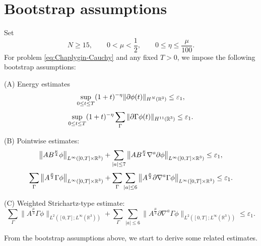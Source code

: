 \documentclass[11pt,twoside]{article}
\def\R{\mathop{\mathbb R\kern 0pt}\nolimits}
\def\f{\frac}
\def\p{\partial}
\def\ve{\varepsilon}
\theoremstyle{plain}
\theoremstyle{definition}
\theoremstyle{assumption}
\numberwithin{equation}{section}
\begin{document}
	\section{Bootstrap assumptions}
	\label{sec:CVP-bootstrap-assumptions}

	
	Set
		\begin{equation}
		\label{eq:CVP-bootstrap-parameter-range}
		N \ge 15,
		\qquad
		0<\mu<\frac12,
		\qquad
		0\le\eta\le\frac{\mu}{100}.
	\end{equation}
	For problem \eqref{eq:Chaplygin-Cauchy} and any fixed $T>0$, we impose the following bootstrap assumptions:

(A)  Energy estimates
	\begin{equation}
		\label{eq:CVP-bootstrap-energy-ordinary}
		\sup_{0\le t\le T}
		(1+t)^{-\eta}
		\|\p\phi(t)\|_{H^N(\R^3)}
		\le
		\ve_1,
	\end{equation}
	\begin{equation}
		\label{eq:CVP-bootstrap-energy-Gamma}
		\sup_{0\le t\le T}
		(1+t)^{-\eta}
		\sum_{\Gamma}
		\|\p\Gamma\phi(t)\|_{H^{11}(\R^3)}
		\le
		\ve_1.
	\end{equation}

(B) Pointwise estimates:
	\begin{equation}\label{eq:CVP-bootstrap-pointwise-phi}
		\big\|
		AB^{\f\mu4}\phi
		\big\|_{L^\infty([0,T]\times\R^3)}
		+
		\sum_{|a|\le 7}
		\big\|
		AB^{\f\mu4}\nabla^a\p\phi
		\big\|_{L^\infty([0,T]\times\R^3)}
		\le
		\ve_1,
	\end{equation}
	\begin{equation}\label{eq:CVP-bootstrap-pointwise-Gamma}
		\sum_{\Gamma}
		\big\|
		A^{\frac{\mu}{2}}
		\Gamma\phi
		\big\|_{L^\infty([0,T]\times\R^3)}
		+\sum_{\Gamma}\sum_{|a|\le 6}\big\|A^{\frac{\mu}{2}}\p\nabla^a\Gamma\phi\big\|_{L^\infty([0,T]\times\R^3)}
		\le
		\ve_1.
	\end{equation}

(C) Weighted  Strichartz-type estimate:
	\begin{equation}
		\label{eq:CVP-bootstrap-Strichartz-Gamma}
		\sum_{\Gamma}
		\big\|
		A^{\frac{\mu}{3}}
		\Gamma\phi
		\big\|_{L^2([0,T];L^\infty(\mathbb R^3))}
		+
		\sum_{\Gamma}
		\sum_{|a|\le 6}
		\big\|
		A^{\frac{\mu}{3}}
		\partial\nabla^a\Gamma\phi
		\big\|_{L^2([0,T];L^\infty(\mathbb R^3))}
		\le
		\varepsilon_1.
	\end{equation}
	

	From the bootstrap assumptions above, we start to derive some related estimates.
	
\end{document}
